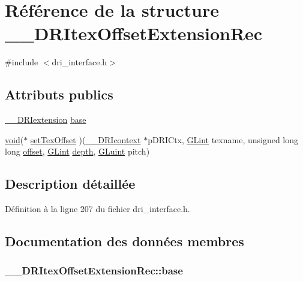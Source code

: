 \hypertarget{struct_____d_r_itex_offset_extension_rec}{\section{Référence de la structure \-\_\-\-\_\-\-D\-R\-Itex\-Offset\-Extension\-Rec}
\label{struct_____d_r_itex_offset_extension_rec}
}


{\ttfamily \#include $<$dri\-\_\-interface.\-h$>$}

\subsection*{Attributs publics}
\begin{DoxyCompactItemize}
\item 
\hyperlink{dri__interface_8h_a4e0a61c8ece00d2b2c6792a9a1b55385}{\-\_\-\-\_\-\-D\-R\-Iextension} \hyperlink{struct_____d_r_itex_offset_extension_rec_a75c040a9b68575c6dd7f470edbe2dbc4}{base}
\item 
\hyperlink{glu_8h_a4292190e3f1f6b373a760c7d9316ad3c}{void}($\ast$ \hyperlink{struct_____d_r_itex_offset_extension_rec_a889d52a2d3520b99644315fe8e947076}{set\-Tex\-Offset} )(\hyperlink{dri__interface_8h_a3fd295cba82b5a3d79f1ee7e12bfb908}{\-\_\-\-\_\-\-D\-R\-Icontext} $\ast$p\-D\-R\-I\-Ctx, \hyperlink{gl_8h_acebcc1c5663f14ebde1d16831e5fed94}{G\-Lint} texname, unsigned long long \hyperlink{glext_8h_ab81054a092f44d2ce010b3c46e3a7ff3}{offset}, \hyperlink{gl_8h_acebcc1c5663f14ebde1d16831e5fed94}{G\-Lint} \hyperlink{gl_8h_a1d280defca3cdf21d6a3144bb2ab95ab}{depth}, \hyperlink{gl_8h_a68c4714e43d8e827d80759f9cb864f3c}{G\-Luint} pitch)
\end{DoxyCompactItemize}


\subsection{Description détaillée}


Définition à la ligne 207 du fichier dri\-\_\-interface.\-h.



\subsection{Documentation des données membres}
\hypertarget{struct_____d_r_itex_offset_extension_rec_a75c040a9b68575c6dd7f470edbe2dbc4}{
\subsubsection[{base}]{ \-\_\-\-\_\-\-D\-R\-Itex\-Offset\-Extension\-Rec\-::base}}\label{struct_____d_r_itex_offset_extension_rec_a75c040a9b68575c6dd7f470edbe2dbc4}


